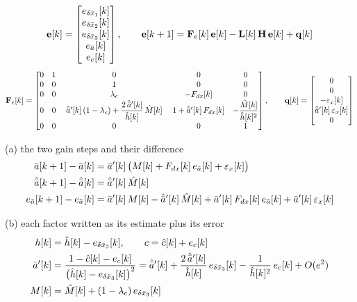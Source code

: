 \[
\mathbf{e}[k] = \begin{bmatrix} e_{\delta\bar{x}_1}[k] \\ e_{\delta\bar{x}_2}[k] \\ e_{\delta\bar{x}_3}[k] \\ e_{\bar{a}}[k] \\ e_c[k] \end{bmatrix},
\qquad
\mathbf{e}[k+1] = \mathbf{F}_e[k]\,\mathbf{e}[k] - \mathbf{L}[k]\,\mathbf{H}\,\mathbf{e}[k] + \mathbf{q}[k]
\]
\[
\mathbf{F}_e[k] =
\begin{bmatrix}
0 & 1 & 0 & 0 & 0 \\
0 & 0 & 1 & 0 & 0 \\
0 & 0 & \lambda_c & -F_{dx}[k] & 0 \\
0 & 0 & \;\hat{\bar{a}}'[k]\,(1-\lambda_c) + \dfrac{2\,\hat{\bar{a}}'[k]}{\hat{h}[k]}\,\hat{M}[k]\; & 1 + \hat{\bar{a}}'[k]\,F_{dx}[k] & -\dfrac{\hat{M}[k]}{\hat{h}[k]^{2}} \\
0 & 0 & 0 & 0 & 1
\end{bmatrix},
\qquad
\mathbf{q}[k] = \begin{bmatrix} 0 \\ 0 \\ -\varepsilon_x[k] \\ \hat{\bar{a}}'[k]\,\varepsilon_x[k] \\ 0 \end{bmatrix}
\]

\clearpage
{}

\noindent (a) the two gain steps and their difference
\[
\begin{aligned}
\bar{a}[k+1] - \bar{a}[k] &= \bar{a}'[k]\,\big(M[k] + F_{dx}[k]\,e_{\bar{a}}[k] + \varepsilon_x[k]\big) \\
\hat{\bar{a}}[k+1] - \hat{\bar{a}}[k] &= \hat{\bar{a}}'[k]\,\hat{M}[k] \\
e_{\bar{a}}[k+1] - e_{\bar{a}}[k] &= \bar{a}'[k]\,M[k] - \hat{\bar{a}}'[k]\,\hat{M}[k] + \bar{a}'[k]\,F_{dx}[k]\,e_{\bar{a}}[k] + \bar{a}'[k]\,\varepsilon_x[k]
\end{aligned}
\]

\noindent (b) each factor written as its estimate plus its error
\[
\begin{aligned}
h[k] &= \hat{h}[k] - e_{\delta\bar{x}_3}[k], \qquad c = \hat{c}[k] + e_c[k] \\
\bar{a}'[k] &= \frac{1 - \hat{c}[k] - e_c[k]}{\big(\hat{h}[k] - e_{\delta\bar{x}_3}[k]\big)^{2}}
= \hat{\bar{a}}'[k] + \frac{2\,\hat{\bar{a}}'[k]}{\hat{h}[k]}\,e_{\delta\bar{x}_3}[k] - \frac{1}{\hat{h}[k]^{2}}\,e_c[k] + O(e^{2}) \\
M[k] &= \hat{M}[k] + (1-\lambda_c)\,e_{\delta\bar{x}_3}[k]
\end{aligned}
\]

